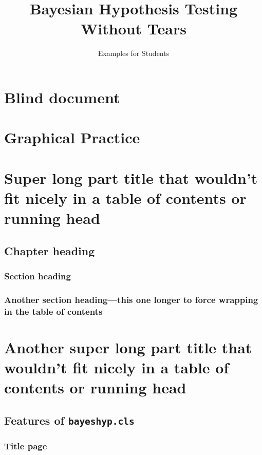 \documentclass{bayeshyp}
\title{Bayesian Hypothesis Testing Without Tears}
\subtitle{Examples for Students}
\begin{document}
\maketitle

\tableofcontents

\mainmatter

\setcounter{secnumdepth}{1}

\part{Blind document}
\Blinddocument

\part[image={example-image-a}]{Graphical Practice}

\part[image={example-image-b},image-options={width=0.25\textwidth},toc={Shorter part title}]{Super long part title that wouldn't fit nicely in a table of contents or running head}
\chapter{Chapter heading}
\section{Section heading}
\section{Another section heading---this one longer to force wrapping in the table of contents}
\lipsum

\part[toc={Old-style, short title=this}]{Another super long part title that wouldn't fit nicely in a table of contents or running head}

\chapter{Features of \texttt{bayeshyp.cls}}

\section{Title page}
\end{document}

